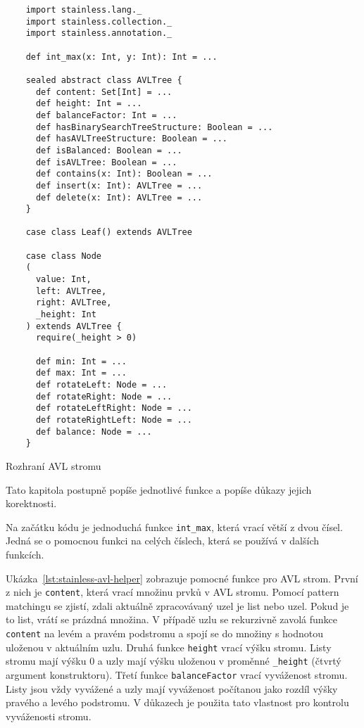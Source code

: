 \begin{listing}[H]
    \begin{verbatim}
    import stainless.lang._
    import stainless.collection._
    import stainless.annotation._

    def int_max(x: Int, y: Int): Int = ...

    sealed abstract class AVLTree {
      def content: Set[Int] = ...
      def height: Int = ...
      def balanceFactor: Int = ...
      def hasBinarySearchTreeStructure: Boolean = ...
      def hasAVLTreeStructure: Boolean = ...
      def isBalanced: Boolean = ...
      def isAVLTree: Boolean = ...
      def contains(x: Int): Boolean = ...
      def insert(x: Int): AVLTree = ...
      def delete(x: Int): AVLTree = ...
    }

    case class Leaf() extends AVLTree

    case class Node
    (
      value: Int,
      left: AVLTree,
      right: AVLTree,
      _height: Int
    ) extends AVLTree {
      require(_height > 0)

      def min: Int = ...
      def max: Int = ...
      def rotateLeft: Node = ...
      def rotateRight: Node = ...
      def rotateLeftRight: Node = ...
      def rotateRightLeft: Node = ...
      def balance: Node = ...
    }
    \end{verbatim}
    \caption{Rozhraní AVL stromu}
    \label{lst:stainless-avl-interface}
\end{listing}

Tato kapitola postupně popíše jednotlivé funkce a popíše důkazy jejich korektnosti.

Na začátku kódu je jednoduchá funkce \texttt{int\_max}, která vrací větší z dvou čísel.
Jedná se o pomocnou funkci na celých číslech, která se používá v dalších funkcích.

Ukázka~\ref{lst:stainless-avl-helper} zobrazuje pomocné funkce pro AVL strom.
První z nich je \texttt{content}, která vrací množinu prvků v AVL stromu.
Pomocí pattern matchingu se zjistí, zdali aktuálně zpracovávaný uzel je list nebo uzel.
Pokud je to list, vrátí se prázdná množina.
V případě uzlu se rekurzivně zavolá funkce \texttt{content} na levém a pravém podstromu
a spojí se do množiny s hodnotou uloženou v aktuálním uzlu.
Druhá funkce \texttt{height} vrací výšku stromu.
Listy stromu mají výšku 0 a uzly mají výšku uloženou v proměnné \texttt{\_height} (čtvrtý argument konstruktoru).
Třetí funkce \texttt{balanceFactor} vrací vyváženost stromu.
Listy jsou vždy vyvážené a uzly mají vyváženost počítanou jako rozdíl výšky pravého a levého podstromu.
V důkazech je použita tato vlastnost pro kontrolu vyváženosti stromu.

